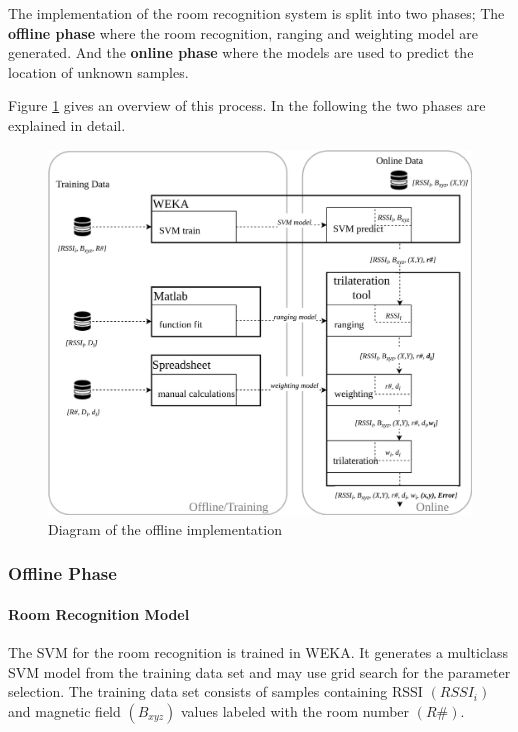 The implementation of the room recognition system is split into two phases; The \textbf{offline phase} where the  room recognition, ranging and weighting model are generated. And the \textbf{online phase} where the models are used to predict the location of unknown samples.

Figure \ref{fig:offlineImplementation} gives an overview of this process. In the following the two phases are explained in detail.

\begin{figure}[ht]
\centering
\includegraphics[width=\textwidth]{Figures/Offline_Set-Up}
\decoRule
\caption[Test bed offline implementation]{Diagram of the offline implementation}
\label{fig:offlineImplementation}
\end{figure}

\subsubsection{Offline Phase}

\paragraph{Room Recognition Model}
The SVM for the room recognition is trained in WEKA. It generates a multiclass SVM model from the training data set and may use grid search for the parameter selection. The training data set consists of samples containing RSSI \((RSSI_{i})\) and magnetic field \((B_{xyz})\) values labeled with the room number \((R\#)\).

